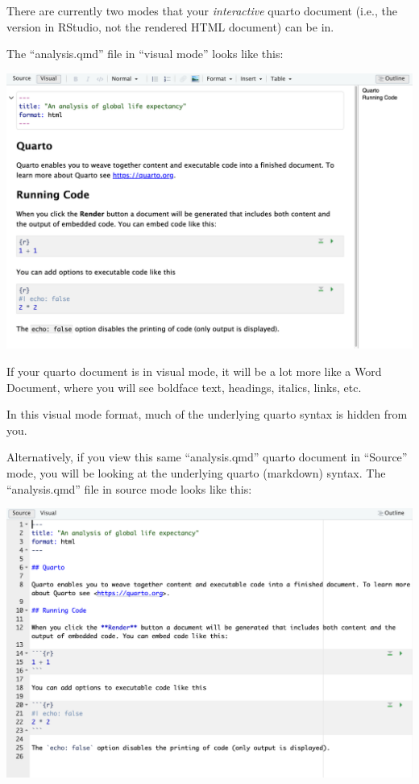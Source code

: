 \documentclass[
  letterpaper,
  DIV=11,
  numbers=noendperiod]{scrreprt}
\begin{document}
There are currently two modes that your \emph{interactive} quarto
document (i.e., the version in RStudio, not the rendered HTML document)
can be in.

The ``analysis.qmd'' file in ``visual mode'' looks like this:

\includegraphics[width=10.71in,height=\textheight]{figures/visual.png}

If your quarto document is in visual mode, it will be a lot more like a
Word Document, where you will see boldface text, headings, italics,
links, etc.

In this visual mode format, much of the underlying quarto syntax is
hidden from you.

Alternatively, if you view this same ``analysis.qmd'' quarto document in
``Source'' mode, you will be looking at the underlying quarto (markdown)
syntax. The ``analysis.qmd'' file in source mode looks like this:

\includegraphics[width=10.71in,height=\textheight]{figures/source.png}
\end{document}
